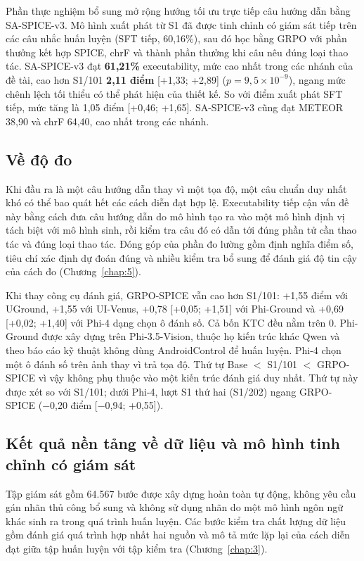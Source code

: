 Phần thực nghiệm bổ sung mở rộng hướng tối ưu trực tiếp câu hướng dẫn bằng SA-SPICE-v3. Mô hình xuất phát từ S1 đã được tinh chỉnh có giám sát tiếp trên các câu nhắc huấn luyện (SFT tiếp, 60,16\%), sau đó học bằng GRPO với phần thưởng kết hợp SPICE, chrF và thành phần thưởng khi câu nêu đúng loại thao tác. SA-SPICE-v3 đạt \textbf{61,21\%} executability, mức cao nhất trong các nhánh của đề tài, cao hơn S1/101 \textbf{2,11 điểm} [+1,33; +2,89] ($p = 9{,}5 \times 10^{-9}$), ngang mức chênh lệch tối thiểu có thể phát hiện của thiết kế. So với điểm xuất phát SFT tiếp, mức tăng là 1,05 điểm [+0,46; +1,65]. SA-SPICE-v3 cũng đạt METEOR 38,90 và chrF 64,40, cao nhất trong các nhánh.

\subsection*{Về độ đo}

Khi đầu ra là một câu hướng dẫn thay vì một tọa độ, một câu chuẩn duy nhất khó có thể bao quát hết các cách diễn đạt hợp lệ. Executability tiếp cận vấn đề này bằng cách đưa câu hướng dẫn do mô hình tạo ra vào một mô hình định vị tách biệt với mô hình sinh, rồi kiểm tra câu đó có dẫn tới đúng phần tử cần thao tác và đúng loại thao tác. Đóng góp của phần đo lường gồm định nghĩa điểm số, tiêu chí xác định dự đoán đúng và nhiều kiểm tra bổ sung để đánh giá độ tin cậy của cách đo (Chương~\ref{chap:5}).

Khi thay công cụ đánh giá, GRPO-SPICE vẫn cao hơn S1/101: +1,55 điểm với UGround, +1,55 với UI-Venus, +0,78 [+0,05; +1,51] với Phi-Ground và +0,69 [+0,02; +1,40] với Phi-4 dạng chọn ô đánh số. Cả bốn KTC đều nằm trên 0. Phi-Ground được xây dựng trên Phi-3.5-Vision, thuộc họ kiến trúc khác Qwen và theo báo cáo kỹ thuật không dùng AndroidControl để huấn luyện. Phi-4 chọn một ô đánh số trên ảnh thay vì trả tọa độ. Thứ tự Base $<$ S1/101 $<$ GRPO-SPICE vì vậy không phụ thuộc vào một kiến trúc đánh giá duy nhất. Thứ tự này được xét so với S1/101; dưới Phi-4, lượt S1 thứ hai (S1/202) ngang GRPO-SPICE ($-$0,20 điểm [$-$0,94; +0,55]).

\subsection*{Kết quả nền tảng về dữ liệu và mô hình tinh chỉnh có giám sát}

Tập giám sát gồm 64.567 bước được xây dựng hoàn toàn tự động, không yêu cầu gán nhãn thủ công bổ sung và không sử dụng nhãn do một mô hình ngôn ngữ khác sinh ra trong quá trình huấn luyện. Các bước kiểm tra chất lượng dữ liệu gồm đánh giá quá trình hợp nhất hai nguồn và mô tả mức lặp lại của cách diễn đạt giữa tập huấn luyện với tập kiểm tra (Chương~\ref{chap:3}).

